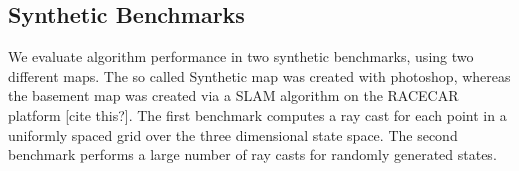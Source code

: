 \documentclass[letterpaper, 10 pt, conference]{ieeeconf}  %
\newcommand{\img}[1]{\begin{center}\texttt{[image: \{\#1]}}\end{center}}
\begin{document}
\subsection{Synthetic Benchmarks}





We evaluate algorithm performance in two synthetic benchmarks, using two different maps. The so called Synthetic map was created with photoshop, whereas the basement map was created via a SLAM algorithm on the RACECAR platform [cite this?]. The first benchmark computes a ray cast for each point in a uniformly spaced grid over the three dimensional state space. The second benchmark performs a large number of ray casts for randomly generated states.
\end{document}
